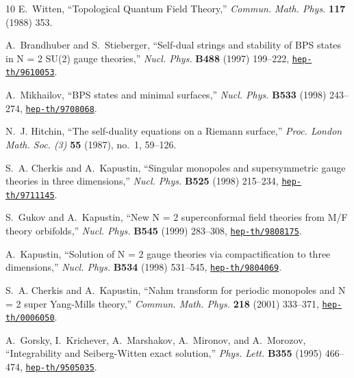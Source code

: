 \begin{thebibliography}{10}
E.~Witten, ``{Topological Quantum Field Theory},'' {\em Commun. Math. Phys.}
  {\bf 117} (1988)
353.

A.~Brandhuber and S.~Stieberger, ``{Self-dual strings and stability of BPS
  states in N = 2 SU(2) gauge theories},'' {\em Nucl. Phys.} {\bf B488} (1997)
  199--222,
\href{http://www.arXiv.org/abs/hep-th/9610053}{{\tt hep-th/9610053}}.

A.~Mikhailov, ``{BPS states and minimal surfaces},'' {\em Nucl. Phys.} {\bf
  B533} (1998) 243--274,
\href{http://www.arXiv.org/abs/hep-th/9708068}{{\tt hep-th/9708068}}.

N.~J. Hitchin, ``The self-duality equations on a {R}iemann surface,'' {\em
  Proc. London Math. Soc. (3)} {\bf 55} (1987), no.~1, 59--126.

S.~A. Cherkis and A.~Kapustin, ``{Singular monopoles and supersymmetric gauge
  theories in three dimensions},'' {\em Nucl. Phys.} {\bf B525} (1998)
  215--234,
\href{http://www.arXiv.org/abs/hep-th/9711145}{{\tt hep-th/9711145}}.

S.~Gukov and A.~Kapustin, ``{New N = 2 superconformal field theories from M/F
  theory orbifolds},'' {\em Nucl. Phys.} {\bf B545} (1999) 283--308,
\href{http://www.arXiv.org/abs/hep-th/9808175}{{\tt hep-th/9808175}}.

A.~Kapustin, ``{Solution of N = 2 gauge theories via compactification to three
  dimensions},'' {\em Nucl. Phys.} {\bf B534} (1998) 531--545,
\href{http://www.arXiv.org/abs/hep-th/9804069}{{\tt hep-th/9804069}}.

S.~A. Cherkis and A.~Kapustin, ``{Nahm transform for periodic monopoles and N =
  2 super Yang-Mills theory},'' {\em Commun. Math. Phys.} {\bf 218} (2001)
  333--371,
\href{http://www.arXiv.org/abs/hep-th/0006050}{{\tt hep-th/0006050}}.

A.~Gorsky, I.~Krichever, A.~Marshakov, A.~Mironov, and A.~Morozov,
  ``{Integrability and Seiberg-Witten exact solution},'' {\em Phys. Lett.} {\bf
  B355} (1995) 466--474,
\href{http://www.arXiv.org/abs/hep-th/9505035}{{\tt hep-th/9505035}}.


\end{thebibliography}
